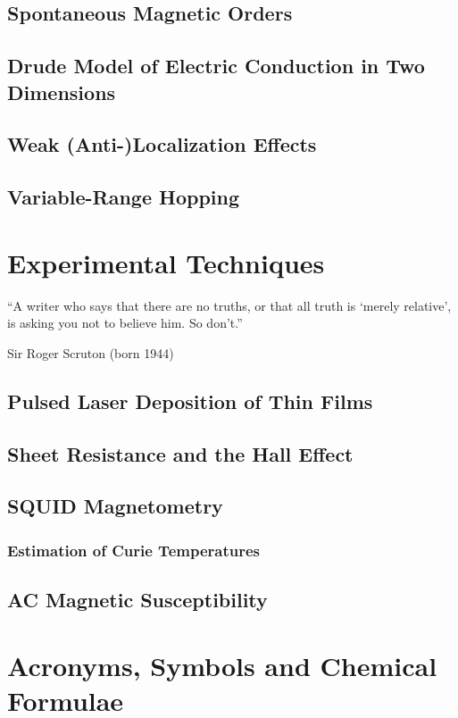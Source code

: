 ﻿\documentclass{report}
\begin{document}
    \section{Spontaneous Magnetic Orders}\label{sec:magnetism}
        
    \section{Drude Model of Electric Conduction in Two Dimensions}\label{sec:drude}
        
    \section{Weak (Anti-)Localization Effects}\label{sec:wl}
        
    \section{Variable-Range Hopping}\label{sec:vrh}
        
%
%
\chapter{Experimental Techniques}\label{ch:methods}%
\epigraph{``A writer who says that there are no truths, or that all truth is `merely relative', is asking you not to believe him. So don't.''}{Sir Roger Scruton (born 1944)}
    \section{Pulsed Laser Deposition of Thin Films}\label{sec:pld}
		
    \section{Sheet Resistance and the Hall Effect}\label{sec:vdp}
		
    \section{SQUID Magnetometry}\label{sec:squid}
        
    \subsection{Estimation of Curie Temperatures}\label{ap:curie}
        
    \section{AC Magnetic Susceptibility}\label{sec:acm}
        
%
%
\chapter{Acronyms, Symbols and Chemical Formulae}
    
%    
\printbibliography[heading=bibintoc]
\end{document}
